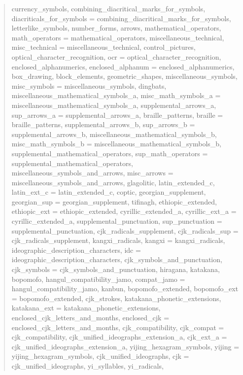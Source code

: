 \documentclass{wg21}
\begin{document}
\begin{quote}
\begin{itemdecl}
{    currency_symbols,
    combining_diacritical_marks_for_symbols,
    diacriticals_for_symbols = combining_diacritical_marks_for_symbols,
    letterlike_symbols,
    number_forms,
    arrows,
    mathematical_operators,
    math_operators = mathematical_operators,
    miscellaneous_technical,
    misc_technical = miscellaneous_technical,
    control_pictures,
    optical_character_recognition,
    ocr = optical_character_recognition,
    enclosed_alphanumerics,
    enclosed_alphanum = enclosed_alphanumerics,
    box_drawing,
    block_elements,
    geometric_shapes,
    miscellaneous_symbols,
    misc_symbols = miscellaneous_symbols,
    dingbats,
    miscellaneous_mathematical_symbols_a,
    misc_math_symbols_a = miscellaneous_mathematical_symbols_a,
    supplemental_arrows_a,
    sup_arrows_a = supplemental_arrows_a,
    braille_patterns,
    braille = braille_patterns,
    supplemental_arrows_b,
    sup_arrows_b = supplemental_arrows_b,
    miscellaneous_mathematical_symbols_b,
    misc_math_symbols_b = miscellaneous_mathematical_symbols_b,
    supplemental_mathematical_operators,
    sup_math_operators = supplemental_mathematical_operators,
    miscellaneous_symbols_and_arrows,
    misc_arrows = miscellaneous_symbols_and_arrows,
    glagolitic,
    latin_extended_c,
    latin_ext_c = latin_extended_c,
    coptic,
    georgian_supplement,
    georgian_sup = georgian_supplement,
    tifinagh,
    ethiopic_extended,
    ethiopic_ext = ethiopic_extended,
    cyrillic_extended_a,
    cyrillic_ext_a = cyrillic_extended_a,
    supplemental_punctuation,
    sup_punctuation = supplemental_punctuation,
    cjk_radicals_supplement,
    cjk_radicals_sup = cjk_radicals_supplement,
    kangxi_radicals,
    kangxi = kangxi_radicals,
    ideographic_description_characters,
    idc = ideographic_description_characters,
    cjk_symbols_and_punctuation,
    cjk_symbols = cjk_symbols_and_punctuation,
    hiragana,
    katakana,
    bopomofo,
    hangul_compatibility_jamo,
    compat_jamo = hangul_compatibility_jamo,
    kanbun,
    bopomofo_extended,
    bopomofo_ext = bopomofo_extended,
    cjk_strokes,
    katakana_phonetic_extensions,
    katakana_ext = katakana_phonetic_extensions,
    enclosed_cjk_letters_and_months,
    enclosed_cjk = enclosed_cjk_letters_and_months,
    cjk_compatibility,
    cjk_compat = cjk_compatibility,
    cjk_unified_ideographs_extension_a,
    cjk_ext_a = cjk_unified_ideographs_extension_a,
    yijing_hexagram_symbols,
    yijing = yijing_hexagram_symbols,
    cjk_unified_ideographs,
    cjk = cjk_unified_ideographs,
    yi_syllables,
    yi_radicals,
}
\end{itemdecl}
\end{quote}
\end{document}
